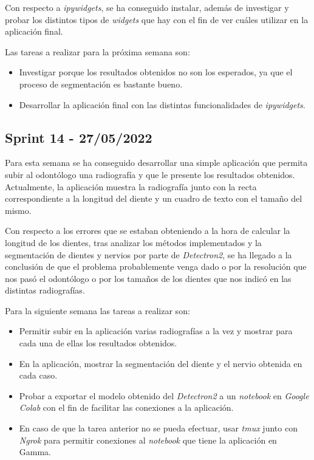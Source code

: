 Con respecto a \emph{ipywidgets}, se ha conseguido instalar, además de investigar y probar los distintos tipos de \emph{widgets} que hay con el fin de ver cuáles utilizar en la aplicación final.

Las tareas a realizar para la próxima semana son:
\begin{itemize}
    \item Investigar porque los resultados obtenidos no son los esperados, ya que el proceso de segmentación es bastante bueno.
    \item Desarrollar la aplicación final con las distintas funcionalidades de \emph{ipywidgets}.
\end{itemize}

\subsection{Sprint 14 - 27/05/2022}
Para esta semana se ha conseguido desarrollar una simple aplicación que permita subir al odontólogo una radiografía y que le presente los resultados obtenidos. Actualmente, la aplicación muestra la radiografía junto con la recta correspondiente a la longitud del diente y un cuadro de texto con el tamaño del mismo.

Con respecto a los errores que se estaban obteniendo a la hora de calcular la longitud de los dientes, tras analizar los métodos implementados y la segmentación de dientes y nervios por parte de \emph{Detectron2}, se ha llegado a la conclusión de que el problema probablemente venga dado o por la resolución que nos pasó el odontólogo o por los tamaños de los dientes que nos indicó en las distintas radiografías.

Para la siguiente semana las tareas a realizar son:
\begin{itemize}
    \item Permitir subir en la aplicación varias radiografías a la vez y mostrar para cada una de ellas los resultados obtenidos.
    \item En la aplicación, mostrar la segmentación del diente y el nervio obtenida en cada caso.
    \item Probar a exportar el modelo obtenido del \emph{Detectron2} a un \emph{notebook} en \emph{Google Colab} con el fin de facilitar las conexiones a la aplicación.
    \item En caso de que la tarea anterior no se pueda efectuar, usar \emph{tmux} junto con \emph{Ngrok} para permitir conexiones al \emph{notebook} que tiene la aplicación en Gamma.
\end{itemize}

